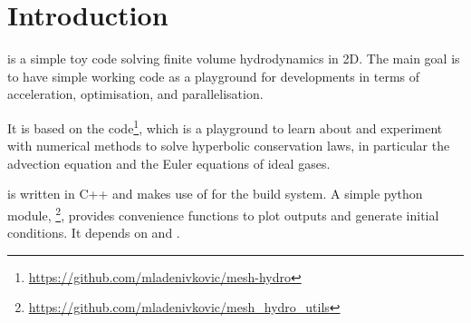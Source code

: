 \newpage


\section{Introduction}


\hydro is a simple toy code solving finite volume hydrodynamics in 2D. The main
goal is to have simple working code as a playground for developments in terms of
acceleration, optimisation, and parallelisation.

It is based on the 
code\footnote{\url{https://github.com/mladenivkovic/mesh-hydro}}, which is a
playground to learn about and experiment with numerical methods to solve
hyperbolic conservation laws, in particular the advection equation and the Euler
equations of ideal gases.

\hydro is written in C++ and makes use of  for the build system.
A simple python module, \footnote{
\url{https://github.com/mladenivkovic/mesh\_hydro\_utils}}, provides convenience
functions to plot outputs and generate initial conditions. It depends on
 and .


